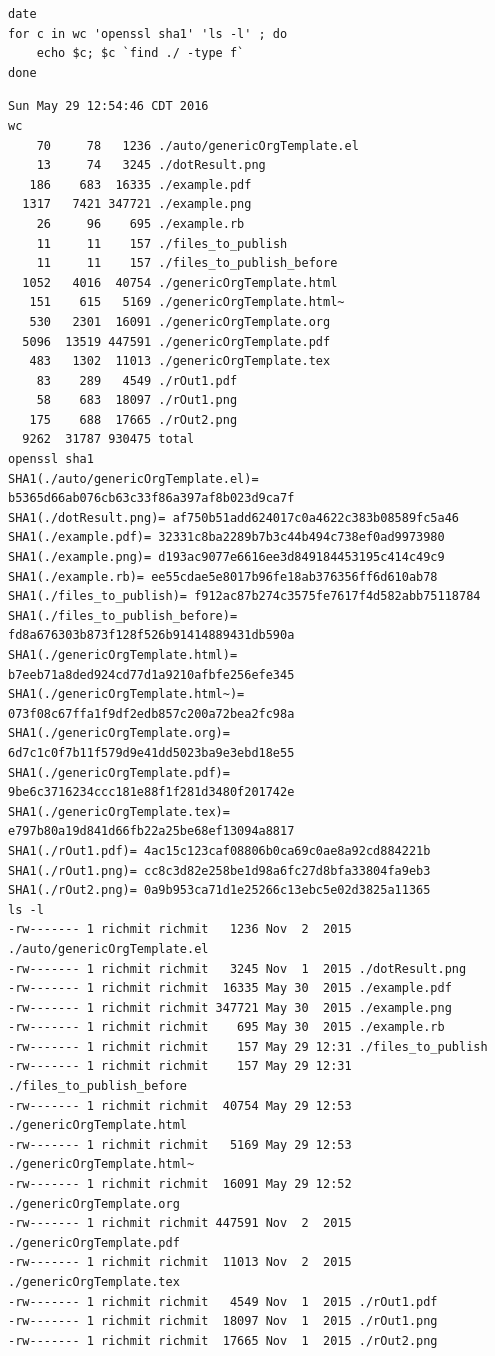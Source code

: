 \documentclass[11pt]{article}
\begin{document}
\begin{verbatim}
date
for c in wc 'openssl sha1' 'ls -l' ; do
    echo $c; $c `find ./ -type f`
done
\end{verbatim}

\begin{verbatim}
Sun May 29 12:54:46 CDT 2016
wc
    70     78   1236 ./auto/genericOrgTemplate.el
    13     74   3245 ./dotResult.png
   186    683  16335 ./example.pdf
  1317   7421 347721 ./example.png
    26     96    695 ./example.rb
    11     11    157 ./files_to_publish
    11     11    157 ./files_to_publish_before
  1052   4016  40754 ./genericOrgTemplate.html
   151    615   5169 ./genericOrgTemplate.html~
   530   2301  16091 ./genericOrgTemplate.org
  5096  13519 447591 ./genericOrgTemplate.pdf
   483   1302  11013 ./genericOrgTemplate.tex
    83    289   4549 ./rOut1.pdf
    58    683  18097 ./rOut1.png
   175    688  17665 ./rOut2.png
  9262  31787 930475 total
openssl sha1
SHA1(./auto/genericOrgTemplate.el)= b5365d66ab076cb63c33f86a397af8b023d9ca7f
SHA1(./dotResult.png)= af750b51add624017c0a4622c383b08589fc5a46
SHA1(./example.pdf)= 32331c8ba2289b7b3c44b494c738ef0ad9973980
SHA1(./example.png)= d193ac9077e6616ee3d849184453195c414c49c9
SHA1(./example.rb)= ee55cdae5e8017b96fe18ab376356ff6d610ab78
SHA1(./files_to_publish)= f912ac87b274c3575fe7617f4d582abb75118784
SHA1(./files_to_publish_before)= fd8a676303b873f128f526b91414889431db590a
SHA1(./genericOrgTemplate.html)= b7eeb71a8ded924cd77d1a9210afbfe256efe345
SHA1(./genericOrgTemplate.html~)= 073f08c67ffa1f9df2edb857c200a72bea2fc98a
SHA1(./genericOrgTemplate.org)= 6d7c1c0f7b11f579d9e41dd5023ba9e3ebd18e55
SHA1(./genericOrgTemplate.pdf)= 9be6c3716234ccc181e88f1f281d3480f201742e
SHA1(./genericOrgTemplate.tex)= e797b80a19d841d66fb22a25be68ef13094a8817
SHA1(./rOut1.pdf)= 4ac15c123caf08806b0ca69c0ae8a92cd884221b
SHA1(./rOut1.png)= cc8c3d82e258be1d98a6fc27d8bfa33804fa9eb3
SHA1(./rOut2.png)= 0a9b953ca71d1e25266c13ebc5e02d3825a11365
ls -l
-rw------- 1 richmit richmit   1236 Nov  2  2015 ./auto/genericOrgTemplate.el
-rw------- 1 richmit richmit   3245 Nov  1  2015 ./dotResult.png
-rw------- 1 richmit richmit  16335 May 30  2015 ./example.pdf
-rw------- 1 richmit richmit 347721 May 30  2015 ./example.png
-rw------- 1 richmit richmit    695 May 30  2015 ./example.rb
-rw------- 1 richmit richmit    157 May 29 12:31 ./files_to_publish
-rw------- 1 richmit richmit    157 May 29 12:31 ./files_to_publish_before
-rw------- 1 richmit richmit  40754 May 29 12:53 ./genericOrgTemplate.html
-rw------- 1 richmit richmit   5169 May 29 12:53 ./genericOrgTemplate.html~
-rw------- 1 richmit richmit  16091 May 29 12:52 ./genericOrgTemplate.org
-rw------- 1 richmit richmit 447591 Nov  2  2015 ./genericOrgTemplate.pdf
-rw------- 1 richmit richmit  11013 Nov  2  2015 ./genericOrgTemplate.tex
-rw------- 1 richmit richmit   4549 Nov  1  2015 ./rOut1.pdf
-rw------- 1 richmit richmit  18097 Nov  1  2015 ./rOut1.png
-rw------- 1 richmit richmit  17665 Nov  1  2015 ./rOut2.png
\end{verbatim}
\end{document}
